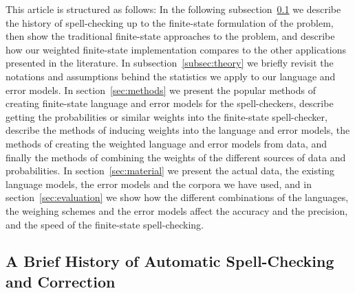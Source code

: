 \documentclass[a4paper,12pt]{article}
\begin{document}
This article is structured as follows: In the following
subsection~\ref{subsec:background} we describe the history of spell-checking up
to the finite-state formulation of the problem, then show the traditional
finite-state approaches to the problem, and describe how our weighted
finite-state implementation compares to the other applications presented in the
literature.  In subsection~\ref{subsec:theory} we briefly revisit the
notations and assumptions behind the statistics we apply to our language
and error models.  In section~\ref{sec:methods} we present the popular methods
of creating finite-state language and error models for the spell-checkers,
describe getting the probabilities or similar weights into the finite-state
spell-checker, describe the methods of inducing weights into the language and
error models, the methods of creating the weighted language and error models
from data, and finally the methods of combining the weights of the different
sources of data and probabilities. In section~\ref{sec:material} we present
the actual data, the existing language models, the error models and the corpora
we have used, and in section~\ref{sec:evaluation} we show how the different
combinations of the languages, the weighing schemes and the error models affect
the accuracy and the precision, and the speed of the finite-state
spell-checking.

\subsection{A Brief History of Automatic Spell-Checking and Correction}
\label{subsec:background}
\end{document}
